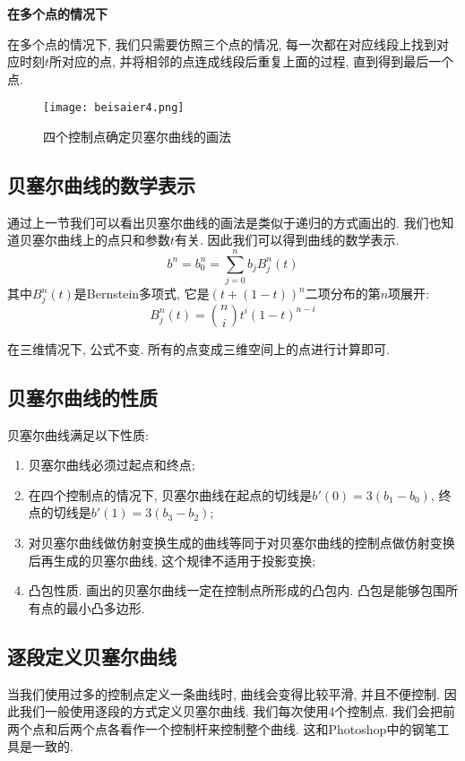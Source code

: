 \documentclass[openany]{progbookcn}
\begin{document}
\textbf{在多个点的情况下}

在多个点的情况下, 我们只需要仿照三个点的情况, 每一次都在对应线段上找到对应时刻$t$所对应的点, 并将相邻的点连成线段后重复上面的过程, 直到得到最后一个点. 

\begin{figure}[H]
\centering
\texttt{[image: beisaier4.png]}
\caption{四个控制点确定贝塞尔曲线的画法}
\label{fig:beisaier4}
\end{figure}

\subsection{贝塞尔曲线的数学表示}

通过上一节我们可以看出贝塞尔曲线的画法是类似于递归的方式画出的. 我们也知道贝塞尔曲线上的点只和参数$t$有关. 因此我们可以得到曲线的数学表示. 
\begin{equation}
	b^n=b_0^n=\sum_{j=0}^nb_jB_j^n(t)
\end{equation}
其中$B_j^n(t)$是Bernstein多项式, 它是$(t+(1-t))^n$二项分布的第$n$项展开: 
\begin{equation}
	B_j^n(t)=\binom{n}{i}t^i(1-t)^{n-i}
\end{equation}

在三维情况下, 公式不变. 所有的点变成三维空间上的点进行计算即可. 

\subsection{贝塞尔曲线的性质}
贝塞尔曲线满足以下性质: 
\begin{enumerate}
	\item 贝塞尔曲线必须过起点和终点; 
	\item 在四个控制点的情况下, 贝塞尔曲线在起点的切线是$b'(0)=3(b_1-b_0)$, 终点的切线是$b'(1)=3(b_3-b_2)$; 
	\item 对贝塞尔曲线做仿射变换生成的曲线等同于对贝塞尔曲线的控制点做仿射变换后再生成的贝塞尔曲线, 这个规律不适用于投影变换; 
	\item 凸包性质. 画出的贝塞尔曲线一定在控制点所形成的凸包内. 凸包是能够包围所有点的最小凸多边形. 
\end{enumerate}

\subsection{逐段定义贝塞尔曲线}
当我们使用过多的控制点定义一条曲线时, 曲线会变得比较平滑, 并且不便控制. 因此我们一般使用逐段的方式定义贝塞尔曲线. 我们每次使用4个控制点. 我们会把前两个点和后两个点各看作一个控制杆来控制整个曲线. 这和Photoshop中的钢笔工具是一致的. 
\end{document}
